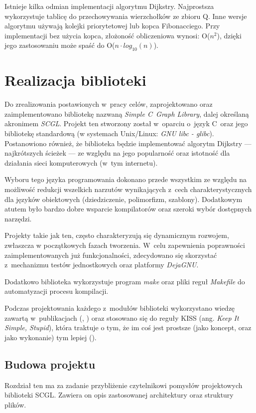 \documentclass[a4paper,12pt,polish,twoside,openright]{thesis}
\begin{document}
Istnieje kilka odmian implementacji algorytmu Dijkstry.
Najprostsza wykorzystuje tablicę do przechowywania wierzchołków ze zbioru Q.
Inne wersje algorytmu używają kolejki priorytetowej lub kopca Fibonacciego.
Przy implementacji bez użycia kopca, złożoność obliczeniowa wynosi: O($n^2$), dzięki jego zastosowaniu może spaść do O($n \cdot log_{10}(n)$)\cite{graphtheory2}.


\chapter{Realizacja biblioteki}
Do zrealizowania postawionych w~pracy celów, zaprojektowano oraz zaimplementowano bibliotekę nazwaną \emph{Simple C~Graph Library}, dalej określaną akronimem \emph{SCGL}.
Projekt ten stworzony został w~oparciu o~język C~oraz jego bibliotekę standardową (w systemach Unix/Linux: \emph{GNU libc - glibc}).
Postanowiono również, że biblioteka będzie implementować algorytm Dijkstry --- najkrótszych ścieżek --- ze względu na jego popularność oraz istotność dla działania sieci komputerowych (w~tym internetu).

Wyboru tego języka programowania dokonano przede wszystkim ze względu na możliwość redukcji wszelkich narzutów wynikających z~cech charakterystycznych dla języków obiektowych (dziedziczenie, polimorfizm, szablony).
Dodatkowym atutem było bardzo dobre wsparcie kompilatorów oraz szeroki wybór dostępnych narzędzi.

Projekty takie jak ten, często charakteryzują się dynamicznym rozwojem, zwłaszcza w początkowych fazach tworzenia.
W~celu zapewnienia poprawności zaimplementowanych już funkcjonalności, zdecydowano się skorzystać z~mechanizmu testów jednostkowych oraz platformy \emph{DejaGNU}.

Dodatkowo biblioteka wykorzystuje program \emph{make} oraz pliki reguł \emph{Makefile} do automatyzacji procesu kompilacji.

Podczas projektowania każdego z~modułów biblioteki wykorzystano wiedzę zawartą w~publikacjach (\cite{unix}, \cite{ansi}) oraz stosowano się do reguły KISS (ang. \emph{Keep It Simple, Stupid}), która traktuje o tym, że im coś jest prostsze (jako koncept, oraz jako wykonanie) tym lepiej (\cite{unix}).
\label{kiss}

\section{Budowa projektu}
Rozdział ten ma za zadanie przybliżenie czytelnikowi pomysłów projektowych biblioteki SCGL.
Zawiera on opis zastosowanej architektury oraz struktury plików.
\end{document}
